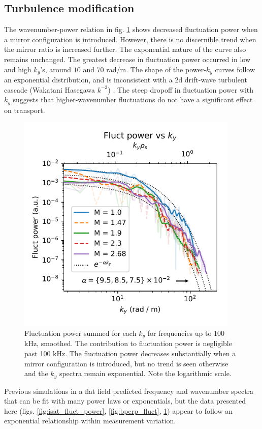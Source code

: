 \subsection{\label{sec:sub_turbulence}Turbulence modification}
 The wavenumber-power relation in fig. \ref{fig:fluct-power_ky} shows decreased fluctuation power when a mirror configuration is introduced. However, there is no discernible trend when the mirror ratio is increased further. The exponential nature of the curve also remains unchanged. The greatest decrease in fluctuation power occurred in low and high $k_y$'s, around $10$ and $70$ rad/m. The shape of the power-$k_y$ curves follow an exponential distribution, and is inconsistent with a 2d drift-wave turbulent cascade (Wakatani Hasegawa $k^{-3}$) \cite{Hasegawa-Wakatani}. The steep dropoff in fluctuation power with $k_y$ suggests that higher-wavenumber fluctuations do not have a significant effect on transport.
\begin{figure}
    \centering
    \includegraphics[width=300pt]{figures/fig12.pdf}
    \caption{Fluctuation power summed for each $k_y$ for frequencies up to 100 kHz, smoothed. The contribution to fluctuation power is negligible past 100 kHz. The fluctuation power decreases substantially when a mirror configuration is introduced, but no trend is seen otherwise and the $k_y$ spectra remain exponential. Note the logarithmic scale.}
    \label{fig:fluct-power_ky}
\end{figure}

Previous simulations in a flat field \cite{Friedman_simulation_2013} predicted frequency and wavenumber spectra that can be fit with many power laws or exponentials, but the data presented here (figs. \ref{fig:isat_fluct_power}, \ref{fig:bperp_fluct}, \ref{fig:fluct-power_ky}) appear to follow an exponential relationship within measurement variation.

